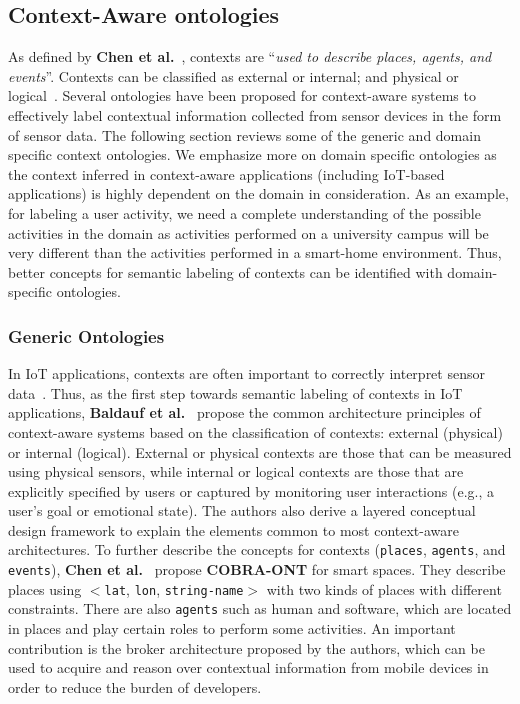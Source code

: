 \documentclass{elsart}  %
\begin{document}
\subsection{Context-Aware ontologies}
As defined by \textbf{Chen et al.}~\cite{chen2003ontology}, contexts are ``\textit{used to describe places, agents, and events}''. Contexts can be classified as external or internal; and physical or logical~\cite{baldauf2007survey}. Several ontologies have been proposed for context-aware systems to effectively label contextual information collected from sensor devices in the form of sensor data. The following section reviews some of the generic and domain specific context ontologies. We emphasize more on domain specific ontologies as the context inferred in context-aware applications (including IoT-based applications) is highly dependent on the domain in consideration. As an example, for labeling a user activity, we need a complete understanding of the possible activities in the domain as activities performed on a university campus will be very different than the activities performed in a smart-home environment. Thus, better concepts for semantic labeling of contexts can be identified with domain-specific ontologies.
\subsubsection{Generic Ontologies}
In IoT applications, contexts are often important to correctly interpret sensor data~\cite{perera2014context}. Thus, as the first step towards semantic labeling of contexts in IoT applications, \textbf{Baldauf et al.}~\cite{baldauf2007survey} propose the common architecture principles of context-aware systems based on the classification of contexts: external (physical) or internal (logical). External or physical contexts are those that can be measured using physical sensors, while internal or logical contexts are those that are explicitly specified by users or captured by monitoring user interactions (e.g., a user's goal or emotional state). The authors also derive a layered conceptual design framework to explain the elements common to most context-aware architectures. To further describe the concepts for contexts (\texttt{places}, \texttt{agents}, and \texttt{events}), \textbf{Chen et al.}~\cite{chen2003ontology} propose \textbf{COBRA-ONT} for smart spaces. They describe places using $<$\texttt{lat}, \texttt{lon}, \texttt{string-name}$>$ with two kinds of places with different constraints. There are also \texttt{agents} such as human and software, which are located in places and play certain roles to perform some activities. An important contribution is the broker architecture proposed by the authors, which can be used to acquire and reason over contextual information from mobile devices in order to reduce the burden of developers.
\end{document}
